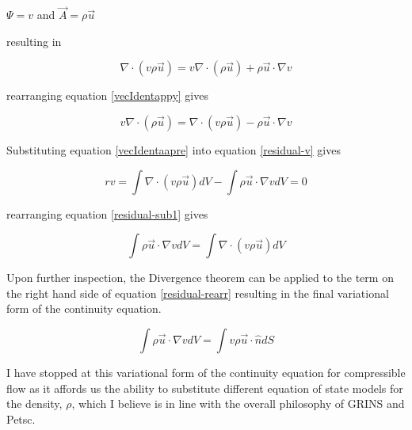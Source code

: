 \documentclass{report}
\begin{document}
$\Psi = v$  and
$\vec{A} = \rho \vec{u}$

resulting in

\begin{equation} \label{vecIdentapply}
\nabla \cdot (v \rho \vec{u}) = v \nabla \cdot (\rho \vec{u}) + \rho \vec{u} \cdot \nabla v
\end{equation}

rearranging equation \ref{vecIdentappy} gives

\begin{equation} \label{vecIdentappre}
v \nabla \cdot (\rho \vec{u}) = \nabla \cdot (v \rho \vec{u}) - \rho \vec{u} \cdot \nabla v
\end{equation}

Substituting equation \ref{vecIdentaapre} into equation \ref{residual-v} gives

\begin{equation} \label{residual-sub1}
rv = \int \nabla \cdot (v \rho \vec{u}) dV - \int \rho \vec{u} \cdot \nabla v dV = 0
\end{equation}

rearranging equation \ref{residual-sub1} gives

\begin{equation} \label{residual-rearr}
\int \rho \vec{u} \cdot \nabla v dV = \int \nabla \cdot (v \rho \vec{u}) dV
\end{equation}

Upon further inspection, the Divergence theorem can be applied to the term on the right hand
side of equation \ref{residual-rearr} resulting in the final variational form of the continuity
equation.

\begin{equation}
\int \rho \vec{u} \cdot \nabla v dV = \int v \rho \vec{u} \cdot \hat{n} dS
\end{equation}

I have stopped at this variational form of the continuity equation for compressible flow as it 
affords us the ability to substitute different equation of state models for the density, $\rho$, 
which I believe is in line with the overall philosophy of GRINS and Petsc. 
\end{document}
